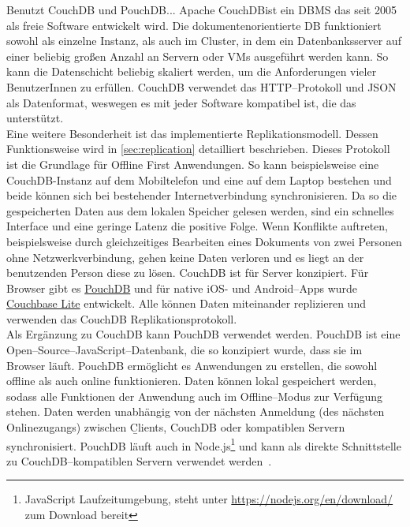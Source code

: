 Benutzt CouchDB und PouchDB...\cite{hoodie}
%
%
Apache CouchDB\tm ist ein \gls{DBMS} das seit 2005 als freie Software entwickelt wird. Die dokumentenorientierte \gls{DB} funktioniert sowohl als einzelne Instanz, als auch im Cluster, in dem ein Datenbanksserver auf einer beliebig großen Anzahl an Servern oder \glspl{VM} ausgeführt werden kann. So kann die Datenschicht beliebig skaliert werden, um die Anforderungen vieler BenutzerInnen zu erfüllen. CouchDB verwendet das HTTP--Protokoll und \gls{JSON} als Datenformat, weswegen es mit jeder Software kompatibel ist, die das unterstützt.\\
Eine weitere Besonderheit ist das implementierte Replikationsmodell. Dessen Funktionsweise wird in \autoref{sec:replication} detailliert beschrieben. Dieses Protokoll ist die Grundlage für Offline First Anwendungen. So kann beispielsweise eine CouchDB-Instanz auf dem Mobiltelefon und eine auf dem Laptop bestehen und beide können sich bei bestehender Internetverbindung synchronisieren. Da so die gespeicherten Daten aus dem lokalen Speicher gelesen werden, sind ein schnelles Interface und eine geringe Latenz die positive Folge. Wenn Konflikte auftreten, beispielsweise durch gleichzeitiges Bearbeiten eines Dokuments von zwei Personen ohne Netzwerkverbindung, gehen keine Daten verloren und es liegt an der benutzenden Person diese zu lösen. CouchDB ist für Server konzipiert. Für Browser gibt es \hyperref[sub:pouch]{PouchDB} und für native iOS- und Android--\glspl{App} wurde \hyperref[sub:couchbase]{Couchbase Lite} entwickelt. Alle können Daten miteinander replizieren und verwenden das CouchDB Replikationsprotokoll.~\cite{couch}\\
%
%
Als Ergänzung zu CouchDB kann PouchDB verwendet werden. PouchDB ist eine Open--Source--JavaScript--Datenbank, die so konzipiert wurde, dass sie im Browser läuft. PouchDB ermöglicht es Anwendungen zu erstellen, die sowohl offline als auch online funktionieren. Daten können lokal gespeichert werden, sodass alle Funktionen der Anwendung auch im Offline--Modus zur Verfügung stehen.
Daten werden unabhängig von der nächsten Anmeldung (des nächsten Onlinezugangs) zwischen \b{Clients}, CouchDB oder kompatiblen Servern synchronisiert.
PouchDB läuft auch in Node.js\footnote{JavaScript Laufzeitumgebung, steht unter \url{https://nodejs.org/en/download/} zum Download bereit} und kann als direkte Schnittstelle zu CouchDB--kompatiblen Servern verwendet werden~\cite{pouch}.
